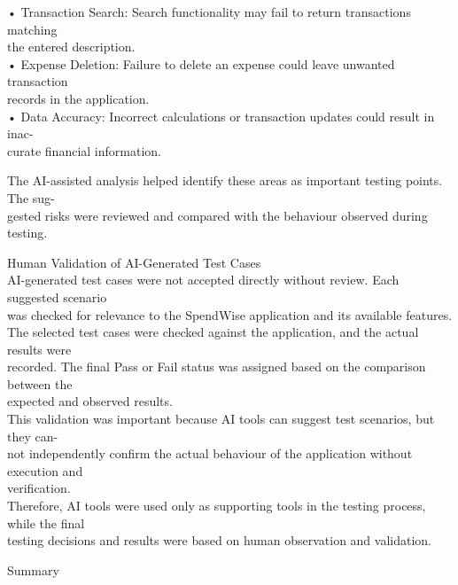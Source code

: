 \documentclass[12pt,a4paper]{report}
\begin{document}
\smallskip
• Transaction Search: Search functionality may fail to return transactions matching\\ 
the entered description.\\ 

\smallskip
• Expense Deletion: Failure to delete an expense could leave unwanted transaction\\ 
records in the application.\\ 

\smallskip
• Data Accuracy: Incorrect calculations or transaction updates could result in inac-\\ 
curate financial information.\\ 

\smallskip

\smallskip
The AI-assisted analysis helped identify these areas as important testing points. The sug-\\ 
gested risks were reviewed and compared with the behaviour observed during testing.\\ 

\smallskip

 Human Validation of AI-Generated Test Cases\\ 

\smallskip
AI-generated test cases were not accepted directly without review. Each suggested scenario\\ 
was checked for relevance to the SpendWise application and its available features.\\ 
The selected test cases were checked against the application, and the actual results were\\ 
recorded. The final Pass or Fail status was assigned based on the comparison between the\\ 
expected and observed results.\\ 
This validation was important because AI tools can suggest test scenarios, but they can-\\ 
not independently confirm the actual behaviour of the application without execution and\\ 
verification.\\ 
Therefore, AI tools were used only as supporting tools in the testing process, while the final\\ 
testing decisions and results were based on human observation and validation.\\ 

\smallskip

 Summary\\ 
\end{document}
